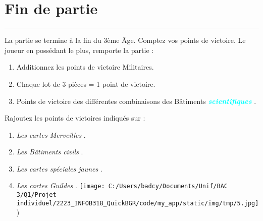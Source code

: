 \documentclass{scrartcl}%
\begin{document}
\section{ Fin de partie
}%
\label{sec:Findepartie}%
\textcolor{cyan}{\rule{18cm}{0.07cm}}\break%
La partie se termine à la fin du 3ème Âge. Comptez vos points de victoire. Le joueur en possédant le plus, remporte la partie :
%
\begin{enumerate}%
\item%
%
 Additionnez les points de victoire Militaires.
%
\item%
%
 Chaque lot de 3 pièces = 1 point de victoire.
%
\item%
%
 Points de victoire des différentes combinaisons des Bâtiments %
\textcolor{cyan}{\textbf{\textit{scientifiques}}}%
.
%
\end{enumerate}%
Rajoutez les points de victoires indiqués sur :
%
\begin{enumerate}%
\item%
%
\textit{Les cartes Merveilles}%
.
%
\item%
%
\textit{Les Bâtiments civils}%
. 
%
\item%
%
\textit{Les cartes spéciales jaunes}%
.
%
\item%
%
\textit{Les cartes Guildes}%
. %
\texttt{[image: C:/Users/badcy/Documents/Unif/BAC 3/Q1/Projet individuel/2223\_INFOB318\_QuickBGR/code/my\_app/static/img/tmp/5.jpg]}%
%
)%
\end{enumerate}

%
\end{document}
